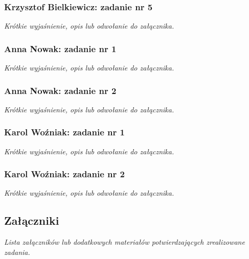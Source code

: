 \documentclass[12pt,a4paper,oneside]{article}
\theoremstyle{definition}
\numberwithin{equation}{section}
\begin{document}
\subsubsection{Krzysztof Bielkiewicz: zadanie nr 5}
\label{1.3.5}
\textit{Krótkie wyjaśnienie, opis lub odwołanie do załącznika.}


\subsubsection{Anna Nowak: zadanie nr 1}
\textit{Krótkie wyjaśnienie, opis lub odwołanie do załącznika.}
\subsubsection{Anna Nowak: zadanie nr 2}
\textit{Krótkie wyjaśnienie, opis lub odwołanie do załącznika.}


\subsubsection{Karol Woźniak: zadanie nr 1}
\textit{Krótkie wyjaśnienie, opis lub odwołanie do załącznika.}
\subsubsection{Karol Woźniak: zadanie nr 2}
\textit{Krótkie wyjaśnienie, opis lub odwołanie do załącznika.}

\subsection{Załączniki}
\textit{Lista załączników lub dodatkowych materiałów potwierdzających zrealizowane zadania.}



\renewcommand\refname{Literatura (jeżeli wymagana)}

%
%
%
\end{document}
